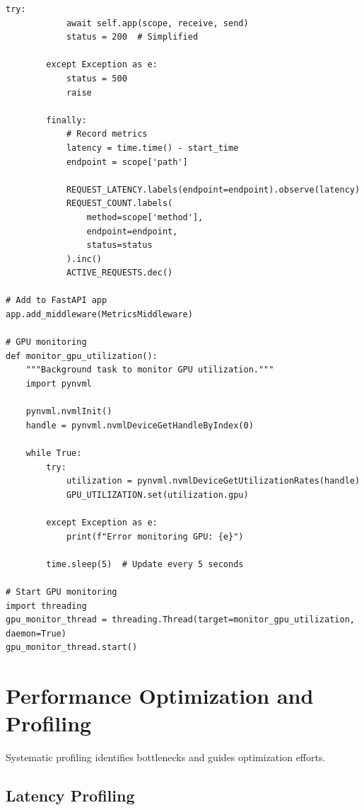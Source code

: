 \begin{lstlisting}[style=python, caption=Custom metrics for autoscaling]
        try:
            await self.app(scope, receive, send)
            status = 200  # Simplified

        except Exception as e:
            status = 500
            raise

        finally:
            # Record metrics
            latency = time.time() - start_time
            endpoint = scope['path']

            REQUEST_LATENCY.labels(endpoint=endpoint).observe(latency)
            REQUEST_COUNT.labels(
                method=scope['method'],
                endpoint=endpoint,
                status=status
            ).inc()
            ACTIVE_REQUESTS.dec()

# Add to FastAPI app
app.add_middleware(MetricsMiddleware)

# GPU monitoring
def monitor_gpu_utilization():
    """Background task to monitor GPU utilization."""
    import pynvml

    pynvml.nvmlInit()
    handle = pynvml.nvmlDeviceGetHandleByIndex(0)

    while True:
        try:
            utilization = pynvml.nvmlDeviceGetUtilizationRates(handle)
            GPU_UTILIZATION.set(utilization.gpu)

        except Exception as e:
            print(f"Error monitoring GPU: {e}")

        time.sleep(5)  # Update every 5 seconds

# Start GPU monitoring
import threading
gpu_monitor_thread = threading.Thread(target=monitor_gpu_utilization, daemon=True)
gpu_monitor_thread.start()
\end{lstlisting}

\section{Performance Optimization and Profiling}

Systematic profiling identifies bottlenecks and guides optimization efforts.

\subsection{Latency Profiling}

